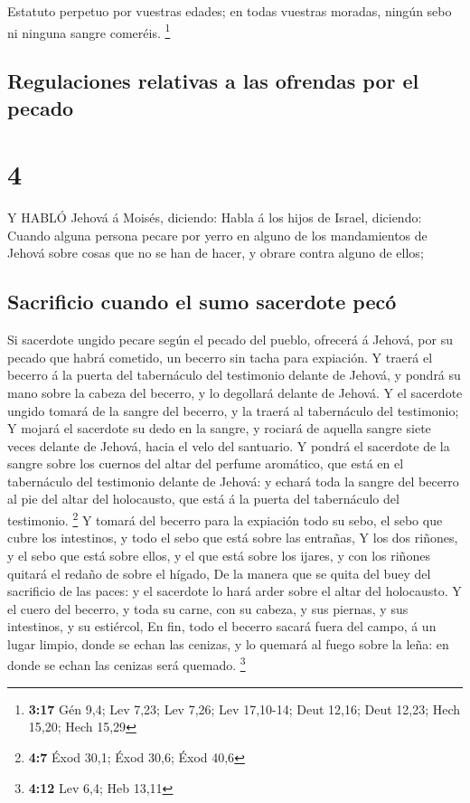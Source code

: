  Estatuto perpetuo por vuestras edades; en todas vuestras
moradas, ningún sebo ni ninguna sangre comeréis. \footnote{\textbf{3:17}
  Gén 9,4; Lev 7,23; Lev 7,26; Lev 17,10-14; Deut 12,16; Deut 12,23;
  Hech 15,20; Hech 15,29}

\hypertarget{regulaciones-relativas-a-las-ofrendas-por-el-pecado}{%
\subsection{Regulaciones relativas a las ofrendas por el
pecado}\label{regulaciones-relativas-a-las-ofrendas-por-el-pecado}}

\hypertarget{section-3}{%
\section{4}\label{section-3}}

 Y HABLÓ Jehová á Moisés, diciendo:  Habla á los
hijos de Israel, diciendo: Cuando alguna persona pecare por yerro en
alguno de los mandamientos de Jehová sobre cosas que no se han de hacer,
y obrare contra alguno de ellos;

\hypertarget{sacrificio-cuando-el-sumo-sacerdote-pecuxf3}{%
\subsection{Sacrificio cuando el sumo sacerdote
pecó}\label{sacrificio-cuando-el-sumo-sacerdote-pecuxf3}}

 Si sacerdote ungido pecare según el pecado del pueblo,
ofrecerá á Jehová, por su pecado que habrá cometido, un becerro sin
tacha para expiación.  Y traerá el becerro á la puerta del
tabernáculo del testimonio delante de Jehová, y pondrá su mano sobre la
cabeza del becerro, y lo degollará delante de Jehová.  Y el
sacerdote ungido tomará de la sangre del becerro, y la traerá al
tabernáculo del testimonio;  Y mojará el sacerdote su dedo
en la sangre, y rociará de aquella sangre siete veces delante de Jehová,
hacia el velo del santuario.  Y pondrá el sacerdote de la
sangre sobre los cuernos del altar del perfume aromático, que está en el
tabernáculo del testimonio delante de Jehová: y echará toda la sangre
del becerro al pie del altar del holocausto, que está á la puerta del
tabernáculo del testimonio. \footnote{\textbf{4:7} Éxod 30,1; Éxod 30,6;
  Éxod 40,6}  Y tomará del becerro para la expiación todo su
sebo, el sebo que cubre los intestinos, y todo el sebo que está sobre
las entrañas,  Y los dos riñones, y el sebo que está sobre
ellos, y el que está sobre los ijares, y con los riñones quitará el
redaño de sobre el hígado,  De la manera que se quita del
buey del sacrificio de las paces: y el sacerdote lo hará arder sobre el
altar del holocausto.  Y el cuero del becerro, y toda su
carne, con su cabeza, y sus piernas, y sus intestinos, y su estiércol,
 En fin, todo el becerro sacará fuera del campo, á un lugar
limpio, donde se echan las cenizas, y lo quemará al fuego sobre la leña:
en donde se echan las cenizas será quemado. \footnote{\textbf{4:12} Lev
  6,4; Heb 13,11}

